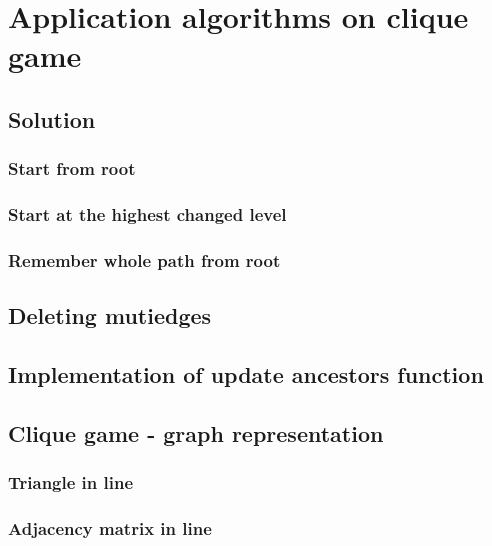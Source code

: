 \chapter{ Application algorithms on clique game }


\section{ Solution  }

\subsection{ Start from root}

\subsection{ Start at the highest changed level}

\subsection{ Remember whole path from root }

\section{ Deleting mutiedges }

\section{ Implementation of update ancestors function}

\section{ Clique game - graph representation }

\subsection{ Triangle in line }

\subsection{  }

\subsection{ Adjacency matrix in line}

